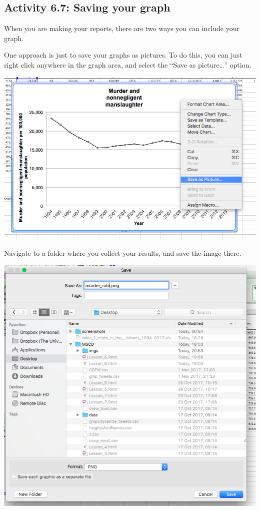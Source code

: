 \documentclass[
]{book}
\begin{document}
\hypertarget{activity-6.7-saving-your-graph}{%
\subsection{Activity 6.7: Saving your graph}\label{activity-6.7-saving-your-graph}}

When you are making your reports, there are two ways you can include your graph.

One approach is just to save your graphs as pictures. To do this, you can just right click anywhere in the graph area, and select the ``Save as picture\ldots{}'' option.

\includegraphics{imgs/save_as_pic.png}

Navigate to a folder where you collect your results, and save the image there.

\includegraphics{imgs/save_pic_2.png}
\end{document}
